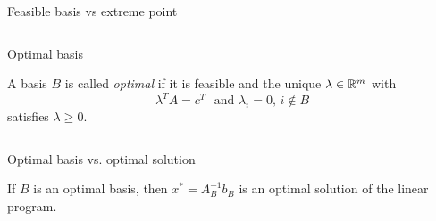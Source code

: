 \begin{frame}{Feasible basis vs extreme point}

  \begin{columns}
    \begin{column}{.5\textwidth}
      
    \end{column}
    \begin{column}{.5\textwidth}
      
    \end{column}       
  \end{columns}
\end{frame}




\begin{frame}{Optimal basis}
\begin{definition}
      \label{def:s-2}
       A basis $B$ is called \emph{optimal} if it is feasible and the
       unique $\lambda \in \mathbb{R}^m$ 
       with 
       \begin{equation}
         \label{eq:s-5}
         \lambda^T A =  c^T \, \, \text{ and } \lambda_i = 0, \, i \notin B 
       \end{equation}
       satisfies $\lambda\geq0$. 
     \end{definition}

  \begin{columns}
    \begin{column}{.5\textwidth}
      
    \end{column}
    \begin{column}{.5\textwidth}
      
    \end{column}       
  \end{columns}
\end{frame}




\begin{frame}{Optimal basis vs. optimal solution}

\begin{theorem}
  \label{thr:s-4}
  If $B$ is an optimal basis, then $x^* = A_B^{-1} b_B$ is an optimal solution of the linear program. 
\end{theorem}

  \begin{columns}
    \begin{column}{.5\textwidth}
      
    \end{column}
    \begin{column}{.5\textwidth}
    
    \end{column}       
  \end{columns}
\end{frame}




